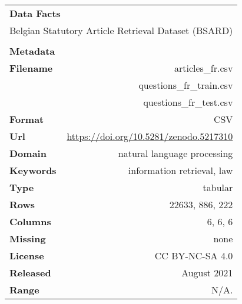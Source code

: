 \documentclass[11pt]{article}
\begin{document}
\begin{table*}[t]
\centering
\small
\begin{subtable}[t]{.55\linewidth}
\centering
\caption*{}
    \begin{tabular}{|lr|}
        \hline
        \multicolumn{2}{|l|}{\textbf{\Large Data Facts}}                                      \\
        \multicolumn{2}{|l|}{Belgian Statutory Article Retrieval Dataset (BSARD)}             \\ \hline
        \multicolumn{2}{l}{}                                                                  \\ \hline
        \multicolumn{2}{|l|}{\textbf{\large Metadata}}                                        \\ \hline
        \textbf{Filename}    & articles\_fr.csv                                        \\
                             & questions\_fr\_train.csv                             \\
                             & questions\_fr\_test.csv                             \\ \hline
        \textbf{Format}      & CSV                                                            \\ \hline
        \textbf{Url}         & {\scriptsize\url{https://doi.org/10.5281/zenodo.5217310}}  \\ \hline
        \textbf{Domain}      & natural language processing                                    \\ \hline
        \textbf{Keywords}    & information retrieval, law                                     \\ \hline
        \textbf{Type}        & tabular                                                        \\ \hline
        \textbf{Rows}        & 22633, 886, 222                    \\ \hline
        \textbf{Columns}     & 6, 6, 6                            \\ \hline
        \textbf{Missing}     & none                                                           \\ \hline
        \textbf{License}     & CC BY-NC-SA 4.0                                                \\ \hline
        \textbf{Released}    & August 2021                                                    \\ \hline
        \textbf{Range}       & N/A.                                                           \\ \hline

\end{tabular}
\end{subtable}
\end{table*}
\end{document}
